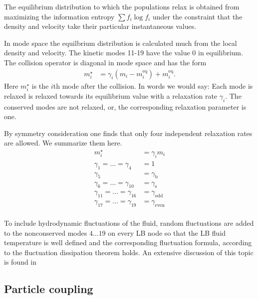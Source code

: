 The equilibrium distribution to which the populations relax 
is obtained from maximizing the information entropy 
$\sum f_i \log f_i$ under the constraint that the density
and velocity take their particular instantaneous 
values. 

In mode space the equilbrium distribution is calculated much from 
the local density and velocity.
The kinetic modes 11-19 have the value 0 in equilibrium.
The collision operator is diagonal in mode space
and has the form
\begin{align*}
  m^\star_i &= \gamma_i \left( m_i - m_i^\text{eq} \right) + m_i ^\text{eq}.
\end{align*}
Here $m^\star_i$ is the $i$th mode after the collision.
In words we would say: Each mode is relaxed is relaxed towards
its equilibrium value with a relaxation rate $\gamma_i$.
The conserved modes are not relaxed, or, the corresponding
relaxation parameter is one.

By symmetry consideration one finds that only four independent
relaxation rates are allowed. We summarize them here.
\begin{align*}
  m^\star_i &= \gamma_i m_i  \\
  \gamma_1=\dots=\gamma_4&=1 \\
  \gamma_5&=\gamma_\text{b} \\
  \gamma_6=\dots=\gamma_{10}&=\gamma_\text{s} \\
  \gamma_{11}=\dots=\gamma_{16}&=\gamma_\text{odd} \\
  \gamma_{17}=\dots = \gamma_{19}&=\gamma_\text{even} \\
\end{align*}

To include hydrodynamic fluctuations of the fluid, 
random fluctuations are added to the nonconserved modes $4\dots 19$ on every LB node so that
the LB fluid temperature is well defined and the corresponding
fluctuation formula, according to the fluctuation dissipation theorem holds.
An extensive discussion of this topic is found in \cite{duenweg07a}

\subsection*{Particle coupling}

